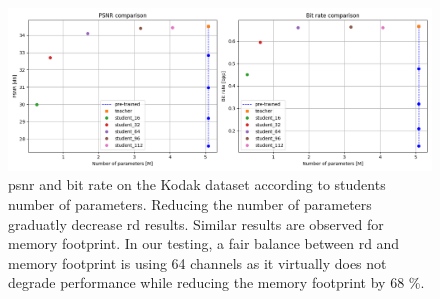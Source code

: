 \begin{figure}
    \centering
    \includegraphics[width=15cm]{img/kd_lic_parameters.png}
    \caption[\acrshort{psnr} and bit rate on the Kodak dataset according to students number of parameters.]{\acrshort{psnr} and bit rate on the Kodak dataset according to students number of parameters. Reducing the number of parameters graduatly decrease \acrshort{rd} results. Similar results are observed for memory footprint. In our testing, a fair balance between \acrshort{rd} and memory footprint is using 64 channels as it virtually does not degrade performance while reducing the memory footprint by 68 \%.}
    \label{kd_lic_parameters}
\end{figure}


